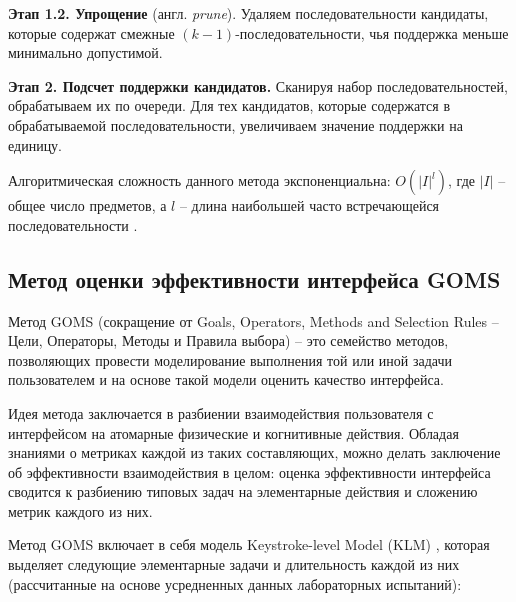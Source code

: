 \textbf{Этап 1.2. Упрощение} (англ. \textit{prune}). Удаляем последовательности кандидаты, которые содержат смежные $(k-1)$-последовательности, чья поддержка меньше минимально допустимой.

\textbf{Этап 2. Подсчет поддержки кандидатов.} Сканируя набор последовательностей, обрабатываем их по очереди. Для тех кандидатов, которые содержатся в обрабатываемой последовательности, увеличиваем значение поддержки на единицу.	


Алгоритмическая сложность данного метода экспоненциальна: $O(|I|^l)$, где $|I|$ -- общее число предметов, а $l$ -- длина наибольшей часто встречающейся последовательности \cite{Data_mining_book}.

\subsection{Метод оценки эффективности интерфейса GOMS}
Метод GOMS (сокращение от Goals, Operators, Methods and Selection Rules -- Цели, Операторы, Методы и Правила выбора) -- это семейство методов, позволяющих провести моделирование выполнения той или иной задачи пользователем и на основе такой модели оценить качество интерфейса.

Идея метода заключается в разбиении взаимодействия пользователя с интерфейсом на атомарные физические и когнитивные действия. Обладая знаниями о метриках каждой из таких составляющих, можно делать заключение об эффективности взаимодействия в целом: оценка
эффективности интерфейса сводится к разбиению типовых задач на элементарные действия и сложению метрик каждого из них.

Метод GOMS включает в себя модель Keystroke-level Model (KLM) \cite{11}, которая выделяет следующие элементарные задачи и длительность каждой из них (рассчитанные на основе усредненных данных лабораторных испытаний):

